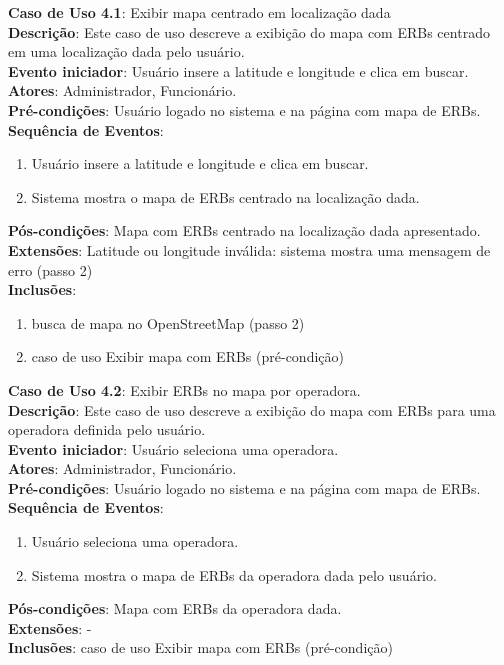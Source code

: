 \documentclass[]{politex}
\begin{document}
\noindent \textbf{Caso de Uso 4.1}: Exibir mapa centrado em localização dada \\
\textbf{Descrição}: Este caso de uso descreve a exibição do mapa com ERBs
centrado em uma localização dada pelo usuário.  \\
\textbf{Evento iniciador}: Usuário insere a latitude e longitude e clica em buscar. \\
\textbf{Atores}: Administrador, Funcionário. \\
\textbf{Pré-condições}: Usuário logado no sistema e na página com mapa de ERBs. \\
\textbf{Sequência de Eventos}:
\begin{enumerate}
\item Usuário insere a latitude e longitude e clica em buscar.
\item Sistema mostra o mapa de ERBs centrado na localização dada.
\end{enumerate}
\textbf{Pós-condições}: Mapa com ERBs centrado na localização dada apresentado. \\
\textbf{Extensões}: Latitude ou longitude inválida: sistema mostra uma mensagem de erro (passo 2) \\
\textbf{Inclusões}:
\begin{enumerate}
\item busca de mapa no OpenStreetMap (passo 2)
\item caso de uso Exibir mapa com ERBs (pré-condição)
\end{enumerate}

\noindent \textbf{Caso de Uso 4.2}: Exibir ERBs no mapa por operadora. \\
\textbf{Descrição}: Este caso de uso descreve a exibição do mapa com ERBs para
uma operadora definida pelo usuário. \\
\textbf{Evento iniciador}: Usuário seleciona uma operadora. \\
\textbf{Atores}: Administrador, Funcionário. \\
\textbf{Pré-condições}: Usuário logado no sistema e na página com mapa de ERBs. \\
\textbf{Sequência de Eventos}:
\begin{enumerate}
\item Usuário seleciona uma operadora.
\item Sistema mostra o mapa de ERBs da operadora dada pelo usuário.
\end{enumerate}
\textbf{Pós-condições}: Mapa com ERBs da operadora dada. \\
\textbf{Extensões}: - \\
\textbf{Inclusões}: caso de uso Exibir mapa com ERBs (pré-condição) \\
\end{document}
